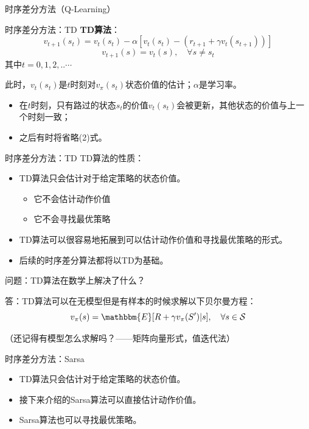 \begin{section}{时序差分方法\alert{（Q-Learning）}}
\begin{frame}{时序差分方法：TD}
    \textbf{TD算法}：
    \setcounter{equation}{0}
    \begin{equation}
        v_{t+1}(s_t)=v_t(s_t)-\alpha[v_t(s_t)-(r_{t+1}+\gamma v_t(s_{t+1}))]
    \end{equation}
    \begin{equation}
        v_{t+1}(s)=v_t(s), \quad \forall s\neq s_t
    \end{equation}
    其中$t=0,1,2,..\cdots$

    此时，$v_t(s_t)$是$t$时刻对$v_\pi(s_t)$状态价值的估计；$\alpha$是学习率。
    \begin{itemize}
        \item 在$t$时刻，只有路过的状态$s_t$的价值$v_t(s_t)$会被更新，其他状态的价值与上一个时刻一致；
        \item 之后有时将省略(2)式。
    \end{itemize}
\end{frame}

\begin{frame}{时序差分方法：TD}
    TD算法的性质：
    \begin{itemize}
        \item TD算法只会估计对于给定策略的\alert{状态价值}。
        \begin{itemize}
            \item 它不会估计动作价值
            \item 它不会寻找最优策略
        \end{itemize}
        \item TD算法可以很容易地拓展到可以估计动作价值和寻找最优策略的形式。
        \item 后续的时序差分算法都将以TD为基础。
    \end{itemize}
    问题：TD算法在数学上解决了什么？

    答：TD算法可以在\alert{无模型}但是\alert{有样本}的时候求解以下贝尔曼方程：
    \[
        v_\pi(s)=\mathbbm{E}[R+\gamma v_\pi(S')|s], \quad \forall s\in\mathcal{S}
    \]

    （还记得有模型怎么求解吗？——矩阵向量形式，值迭代法）
\end{frame}

\begin{frame}{时序差分方法：Sarsa}
    \begin{itemize}
        \item TD算法只会估计对于给定策略的\alert{状态价值}。
        \item 接下来介绍的Sarsa算法可以直接估计动作价值。
        \item Sarsa算法也可以寻找最优策略。
    \end{itemize}
\end{frame}


\end{section}
